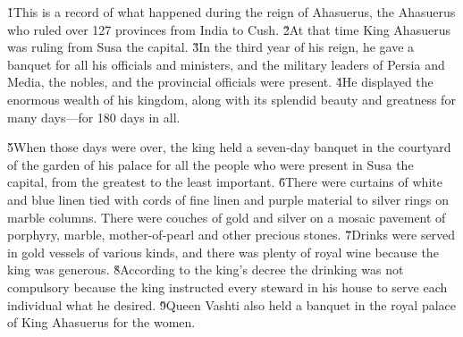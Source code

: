 


\v{1}This is a record of what happened during the reign of Ahasuerus, the Ahasuerus who ruled over 127 provinces from India to Cush. \v{2}At that time King Ahasuerus was ruling from Susa the capital. \v{3}In the third year of his reign, he gave a banquet for all his officials and ministers, and the military leaders of Persia and Media, the nobles, and the provincial officials were present. \v{4}He displayed the enormous wealth of his kingdom, along with its splendid beauty and greatness for many days---for 180 days in all.

\v{5}When those days were over, the king held a seven-day banquet in the courtyard of the garden of his palace for all the people who were present in Susa the capital, from the greatest to the least important. \v{6}There were curtains of white and blue linen tied with cords of fine linen and purple material to silver rings on marble columns. There were couches of gold and silver on a mosaic pavement of porphyry, marble, mother-of-pearl and other precious stones. \v{7}Drinks were served in gold vessels of various kinds, and there was plenty of royal wine because the king was generous. \v{8}According to the king's decree the drinking was not compulsory because the king instructed every steward in his house to serve each individual what he desired. \v{9}Queen Vashti also held a banquet in the royal palace of King Ahasuerus for the women.

